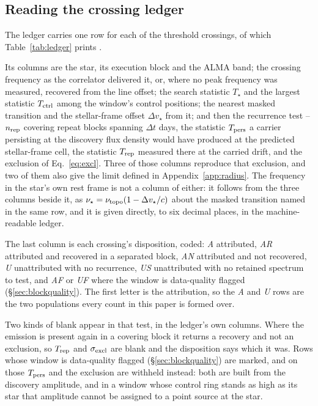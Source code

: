 \subsection{Reading the crossing ledger}
\label{sec:ledgercolumns}

The ledger carries one row for each of the \EvNCrossRaw{} threshold
crossings, of which Table~\ref{tab:ledger} prints \SiLdgSampN.

Its columns are the star, its execution block and
the ALMA band; the crossing frequency as the correlator delivered it, or,
where no peak frequency was measured, recovered from the line offset; the
search statistic $T_\star$ and
the largest statistic $T_{\rm ctrl}$ among the window's \NCtrl{} control
positions; the nearest masked transition and the stellar-frame offset
$\Delta v_\star$ from it; and then the recurrence test -- $n_{\rm rep}$
covering repeat blocks spanning $\Delta t$ days, the statistic $T_{\rm pers}$
a carrier persisting at the discovery flux density would have produced at the
predicted stellar-frame cell, the statistic $T_{\rm rep}$ measured there at
the carried drift, and the exclusion of Eq.~\ref{eq:excl}. Three of those
columns reproduce that exclusion, and two of them also give the limit defined
in Appendix~\ref{app:radius}. The
frequency in the star's own rest frame is
not a column of either: it follows from the three columns beside
it, as $\nu_\star=\nu_{\rm topo}(1-\Delta v_\star/c)$ about the masked
transition named in the same row, and it is given directly, to six decimal
places, in the machine-readable ledger.

The last column is each crossing's disposition, coded: \emph{A} attributed,
\emph{AR} attributed and recovered in a separated block, \emph{AN}
attributed and not recovered, \emph{U} unattributed with no recurrence,
\emph{US} unattributed with no retained spectrum to test, and \emph{AF} or
\emph{UF} where the window is data-quality flagged
(\S\ref{sec:blockquality}). The first letter is the attribution, so the
\emph{A} and \emph{U} rows are the two populations every count in this paper
is formed over.

Two kinds of blank appear in that test, in the ledger's own columns. Where the
emission is present again in
a covering block it returns a recovery and not an exclusion, so
$T_{\rm rep}$ and $\sigma_{\rm excl}$ are blank and the disposition says which
it was. Rows whose window is data-quality flagged
(\S\ref{sec:blockquality}) are marked, and on those $T_{\rm pers}$ and the
exclusion are withheld instead: both are built from the discovery amplitude,
and in a window whose control ring stands as high as its star that amplitude
cannot be assigned to a point source at the star.

